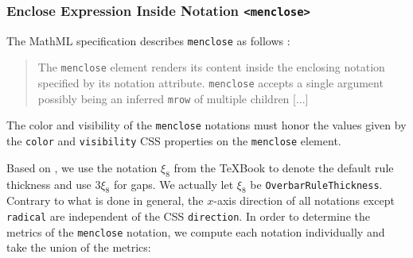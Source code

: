 \subsubsection{Enclose Expression Inside Notation {\tt <menclose>}}

The MathML specification describes {\tt menclose} as follows \cite{MathML3}:
%
\begin{quote}
The {\tt menclose} element renders its content inside the enclosing notation
specified by its notation attribute. {\tt menclose} accepts a single argument
possibly being an inferred {\tt mrow} of multiple children [...]
\end{quote}

The color and visibility of the {\tt menclose} notations must honor the values
given by the {\tt color} and {\tt visibility} CSS properties on the
{\tt menclose} element.

Based on \cite{OpenFontFormat3} \cite{TeXBook}, we use the notation $\xi_8$
from the TeXBook to denote the default rule thickness and use $3\xi_8$ for gaps.
We actually let $\xi_8$ be {\tt OverbarRuleThickness}.
Contrary to what is done in general, the $x$-axis direction of all notations
except {\tt radical} are independent of the CSS {\tt direction}.
In order to determine the metrics of the {\tt menclose} notation, we
compute each notation individually and take the union of the metrics:

